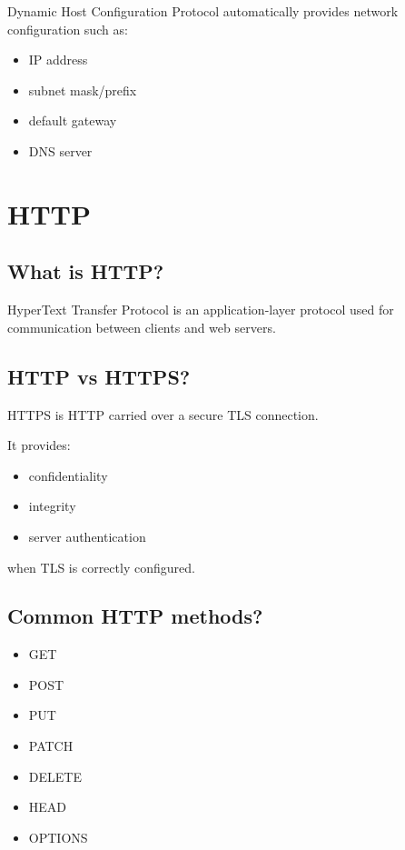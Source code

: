 Dynamic Host Configuration Protocol automatically provides network configuration such as:

\begin{itemize}
  \item IP address
  \item subnet mask/prefix
  \item default gateway
  \item DNS server
\end{itemize}

\medskip

\section{HTTP}

\subsection{What is HTTP?}

HyperText Transfer Protocol is an application-layer protocol used for communication between clients and web servers.

\medskip

\subsection{HTTP vs HTTPS?}

HTTPS is HTTP carried over a secure TLS connection.

It provides:

\begin{itemize}
  \item confidentiality
  \item integrity
  \item server authentication
\end{itemize}

when TLS is correctly configured.

\medskip

\subsection{Common HTTP methods?}

\begin{itemize}
  \item GET
  \item POST
  \item PUT
  \item PATCH
  \item DELETE
  \item HEAD
  \item OPTIONS
\end{itemize}

